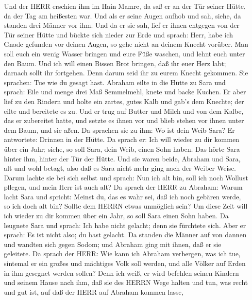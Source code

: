  Und der HERR erschien ihm im Hain Mamre, da saß er an der
Tür seiner Hütte, da der Tag am heißesten war.  Und als er
seine Augen aufhob und sah, siehe, da standen drei Männer vor ihm. Und
da er sie sah, lief er ihnen entgegen von der Tür seiner Hütte und
bückte sich nieder zur Erde  und sprach: Herr, habe ich
Gnade gefunden vor deinen Augen, so gehe nicht an deinem Knecht vorüber.
 Man soll euch ein wenig Wasser bringen und eure Füße
waschen, und lehnt euch unter den Baum.  Und ich will einen
Bissen Brot bringen, daß ihr euer Herz labt; darnach sollt ihr
fortgehen. Denn darum seid ihr zu eurem Knecht gekommen. Sie sprachen:
Tue wie du gesagt hast.  Abraham eilte in die Hütte zu Sara
und sprach: Eile und menge drei Maß Semmelmehl, knete und backe Kuchen.
 Er aber lief zu den Rindern und holte ein zartes, gutes
Kalb und gab's dem Knechte; der eilte und bereitete es zu. 
Und er trug auf Butter und Milch und von dem Kalbe, das er zubereitet
hatte, und setzte es ihnen vor und blieb stehen vor ihnen unter dem
Baum, und sie aßen.  Da sprachen sie zu ihm: Wo ist dein
Weib Sara? Er antwortete: Drinnen in der Hütte.  Da sprach
er: Ich will wieder zu dir kommen über ein Jahr; siehe, so soll Sara,
dein Weib, einen Sohn haben. Das hörte Sara hinter ihm, hinter der Tür
der Hütte.  Und sie waren beide, Abraham und Sara, alt und
wohl betagt, also daß es Sara nicht mehr ging nach der Weiber Weise.
 Darum lachte sie bei sich selbst und sprach: Nun ich alt
bin, soll ich noch Wollust pflegen, und mein Herr ist auch alt?
 Da sprach der HERR zu Abraham: Warum lacht Sara und
spricht: Meinst du, das es wahr sei, daß ich noch gebären werde, so ich
doch alt bin?  Sollte dem HERRN etwas unmöglich sein? Um
diese Zeit will ich wieder zu dir kommen über ein Jahr, so soll Sara
einen Sohn haben.  Da leugnete Sara und sprach: Ich habe
nicht gelacht; denn sie fürchtete sich. Aber er sprach: Es ist nicht
also; du hast gelacht.  Da standen die Männer auf von
dannen und wandten sich gegen Sodom; und Abraham ging mit ihnen, daß er
sie geleitete.  Da sprach der HERR: Wie kann ich Abraham
verbergen, was ich tue,  sintemal er ein großes und
mächtiges Volk soll werden, und alle Völker auf Erden in ihm gesegnet
werden sollen?  Denn ich weiß, er wird befehlen seinen
Kindern und seinem Hause nach ihm, daß sie des HERRN Wege halten und
tun, was recht und gut ist, auf daß der HERR auf Abraham kommen lasse,

